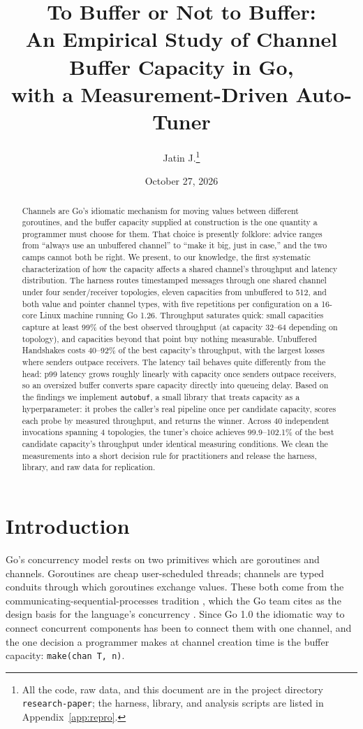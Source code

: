 \documentclass[10pt,a4paper]{article}
\title{To Buffer or Not to Buffer:\\ An Empirical Study of Channel Buffer Capacity in Go,\\
       with a Measurement-Driven Auto-Tuner}
\author{Jatin J.\thanks{All the code, raw data, and this document are in the
project directory \texttt{research-paper}; the harness, library, and analysis
scripts are listed in Appendix~\ref{app:repro}.}}
\date{October 27, 2026}
\begin{document}
\maketitle

\begin{abstract}
Channels are Go's idiomatic mechanism for moving values between different
goroutines, and the buffer capacity supplied at construction is the one
quantity a programmer must choose for them. That choice is presently folklore:
advice ranges from ``always use an unbuffered channel'' to ``make it big, just
in case,'' and the two camps cannot both be right. We present, to our
knowledge, the first systematic characterization of how the capacity affects a
shared channel's throughput and latency distribution. The harness routes
timestamped messages through one shared channel under four sender/receiver
topologies, eleven capacities from unbuffered to 512, and both value and
pointer channel types, with five repetitions per configuration on a 16-core
Linux machine running Go 1.26. Throughput saturates quick: small capacities
capture at least 99\% of the best observed throughput (at capacity 32--64
depending on topology), and capacities beyond that point buy nothing
measurable. Unbuffered Handshakes costs 40--92\% of the best capacity's
throughput, with the largest losses where senders outpace receivers. The
latency tail behaves quite differently from the head: p99 latency grows
roughly linearly with capacity once senders outpace receivers, so an oversized
buffer converts spare capacity directly into queueing delay. Based on the
findings we implement \texttt{autobuf}, a small library that treats capacity
as a hyperparameter: it probes the caller's real pipeline once per candidate
capacity, scores each probe by measured throughput, and returns the winner.
Across 40 independent invocations spanning 4 topologies, the tuner's choice
achieves 99.9--102.1\% of the best candidate capacity's throughput under
identical measuring conditions. We clean the measurements into a short
decision rule for practitioners and release the harness, library, and raw data
for replication.
\end{abstract}

\section{Introduction}
\label{sec:intro}

Go's concurrency model rests on two primitives which are goroutines and
channels. Goroutines are cheap user-scheduled threads; channels are typed
conduits through which goroutines exchange values. These both come from the
communicating-sequential-processes tradition \cite{hoare}, which the Go team
cites as the design basis for the language's concurrency
\cite{pikepatterns,pikeconc}. Since Go 1.0 the idiomatic way to connect
concurrent components has been to connect them with one channel, and the one
decision a programmer makes at channel creation time is the buffer capacity:
\texttt{make(chan T, n)}.
\end{document}
